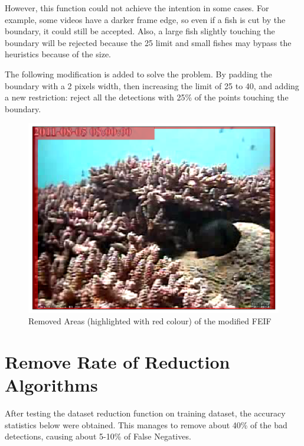 \documentclass[bsc,frontabs,twoside,fullspacing,parskip,deptreport]{infthesis}
\begin{document}
However, this function could not achieve the intention in some cases. 
For example, some videos have a darker frame edge, so even if a fish is cut by the boundary, it could still be accepted. 
Also, a large fish slightly touching the boundary will be rejected because the 25 limit and small fishes may bypass the heuristics because of the size.

The following modification is added to solve the problem.
By padding the boundary with a 2 pixels width, then increasing the limit of 25 to 40, and adding a new restriction: reject all the detections with 25\% of the points touching the boundary. %

\begin{figure}[h]
\centering
    \includegraphics[scale=0.24]{graph/feifzone.png}
    \caption{Removed Areas (highlighted with red colour) of the modified FEIF}
    \label{fig:feifzone}
\end{figure}

\vspace{-15pt}

\section{Remove Rate of Reduction Algorithms}
\label{sec:reduction}


After testing the dataset reduction function on training dataset, the accuracy statistics below were obtained. This manages to remove about 40\% of the bad detections, causing about 5-10\% of False Negatives. 
\end{document}
